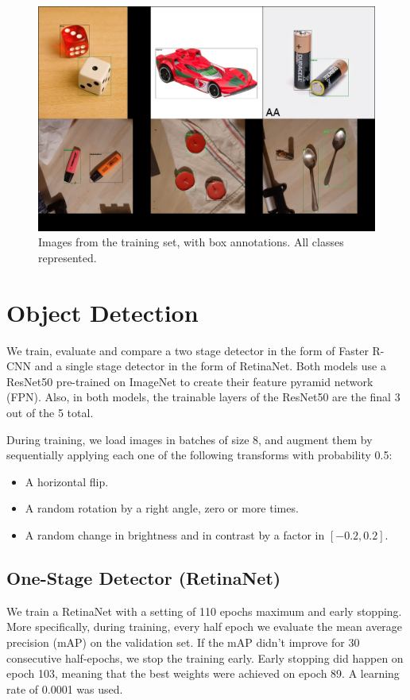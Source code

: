 \documentclass{article}
\begin{document}
\begin{figure}[h]
    \centering
    \includegraphics[width=\textwidth]{one_of_each.png}
    \caption{Images from the training set, with box annotations. All classes represented.}
    \label{fig:one_of_each}
\end{figure}

\section{Object Detection}

We train, evaluate and compare a two stage detector in the form of Faster R-CNN and a single stage detector in the form of RetinaNet. Both models use a ResNet50 pre-trained on ImageNet to create their feature pyramid network (FPN). Also, in both models, the trainable layers of the ResNet50 are the final 3 out of the 5 total.

During training, we load images in batches of size 8, and augment them by sequentially applying each one of the following transforms with probability 0.5:
\begin{itemize}
    \item A horizontal flip.
    \item A random rotation by a right angle, zero or more times.
    \item A random change in brightness and in contrast by a factor in \([-0.2, 0.2]\).
\end{itemize}

\subsection{One-Stage Detector (RetinaNet)}
We train a RetinaNet \cite{retinanet} with a setting of 110 epochs maximum and early stopping. More specifically, during training, every half epoch we evaluate the mean average precision (mAP) on the validation set. If the mAP didn’t improve for 30 consecutive half-epochs, we stop the training early. Early stopping did happen on epoch 103, meaning that the best weights were achieved on epoch 89. A learning rate of 0.0001 was used.
\end{document}
